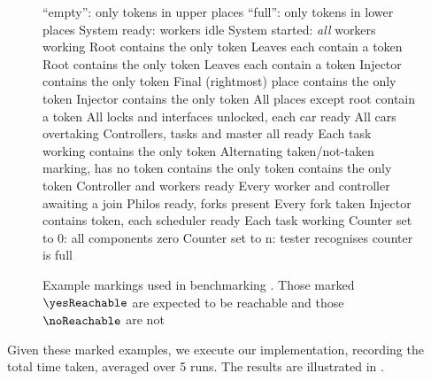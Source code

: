 \begin{figure}[ht]
\begin{multicols}{2}
\begin{itemize}
        {``empty'': only tokens in upper places}
        {``full'': only tokens in lower places}
        {System ready: workers idle}
        {System started: \emph{all} workers working}
        {Root contains the only token}
        {Leaves each contain a token}
        {Root contains the only token}
        {Leaves each contain a token}
        {Injector contains the only token}
        {Final (rightmost) place contains the only token}
        {Injector contains the only token}
        {All places except root contain a token}
        {All locks and interfaces unlocked, each car ready}
        {All cars overtaking}
        {Controllers, tasks and master all ready}
        {Each task working}
        {\addtokC{} contains the only token}
        {Alternating taken/not-taken marking, \addtokC{} has no token}
        {\addtokC{} contains the only token}
        {\taketokC{} contains the only token}
        {Controller and workers ready}
        {Every worker and controller awaiting a join}
        {Philos ready, forks present}
        {Every fork taken}
        {Injector contains token, each scheduler ready}
        {Each task working}
        {Counter set to 0: all components zero}
        {Counter set to n: tester recognises counter is full}
\end{itemize}
\end{multicols}
\newcommand{\capt}{Example markings used in benchmarking
.}
\caption[\capt]{\capt{} Those marked $\yesReachable$ are expected to be
    reachable and those $\noReachable$ are not}
\label{fig:slowmarkings}
\end{figure}

Given these marked examples, we execute our implementation, recording the total
time taken, averaged over 5 runs. The results are illustrated in
.

